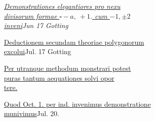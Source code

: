 \clearpage{}\NoSourceHead
\begingroup\fontsize{10}{15}\selectfont\itshape
\noindent\underline{Demonstrationes elegantiores pro nexu}\\
\hspace*{2em}\underline{divisorum formae \(\square-a,\ +1.\) cum \(-1,\pm2\)}\\
\hspace*{2em}\underline{inveni}\hfill Jun 17 Gotting

\medskip
\noindent\underline{Deductionem secundam theoriae polygonorum}\\
\hspace*{2em}\underline{excolui}\hfill Jul. 17 Gotting

\medskip
\noindent\underline{Per utranque methodum monstrari potest}\\
\hspace*{2em}\underline{\underline{puras} tantum aequationes solvi opor}\\
\hspace*{2em}\underline{tere.}

\medskip
\noindent\underline{Quod Oct. 1. per ind. invenimus demonstratione}\\
\hspace*{2em}\underline{munivimus}\hfill Jul. 20.
\endgroup
